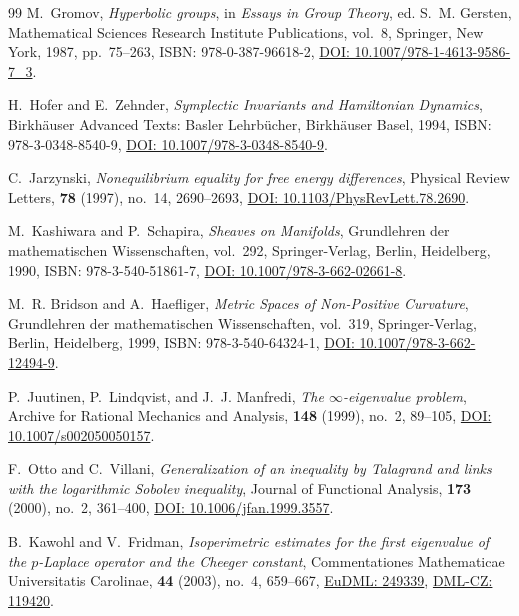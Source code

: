 \documentclass[11pt,a4paper,reqno]{amsart}
\theoremstyle{definition}
\theoremstyle{remark}
\numberwithin{equation}{section}
\begin{document}
\begin{thebibliography}{99}
M.~Gromov,
\emph{Hyperbolic groups},
in \emph{Essays in Group Theory}, ed. S.~M. Gersten, Mathematical Sciences Research Institute Publications, vol.~8, Springer, New York, 1987, pp.~75--263,
ISBN: 978-0-387-96618-2,
\href{https://doi.org/10.1007/978-1-4613-9586-7_3}{DOI: 10.1007/978-1-4613-9586-7\_3}.

H.~Hofer and E.~Zehnder,
\emph{Symplectic Invariants and Hamiltonian Dynamics},
Birkh\"auser Advanced Texts: Basler Lehrb\"ucher, Birkh\"auser Basel, 1994,
ISBN: 978-3-0348-8540-9,
\href{https://doi.org/10.1007/978-3-0348-8540-9}{DOI: 10.1007/978-3-0348-8540-9}.

C.~Jarzynski,
\emph{Nonequilibrium equality for free energy differences},
Physical Review Letters, \textbf{78} (1997), no.~14, 2690--2693,
\href{https://doi.org/10.1103/PhysRevLett.78.2690}{DOI: 10.1103/PhysRevLett.78.2690}.

M.~Kashiwara and P.~Schapira,
\emph{Sheaves on Manifolds},
Grundlehren der mathematischen Wissenschaften, vol.~292, Springer-Verlag, Berlin, Heidelberg, 1990,
ISBN: 978-3-540-51861-7,
\href{https://doi.org/10.1007/978-3-662-02661-8}{DOI: 10.1007/978-3-662-02661-8}.

M.~R. Bridson and A.~Haefliger,
\emph{Metric Spaces of Non-Positive Curvature},
Grundlehren der mathematischen Wissenschaften, vol.~319, Springer-Verlag, Berlin, Heidelberg, 1999,
ISBN: 978-3-540-64324-1,
\href{https://doi.org/10.1007/978-3-662-12494-9}{DOI: 10.1007/978-3-662-12494-9}.

P.~Juutinen, P.~Lindqvist, and J.~J. Manfredi,
\emph{The $\infty$-eigenvalue problem},
Archive for Rational Mechanics and Analysis, \textbf{148} (1999), no.~2, 89--105,
\href{https://doi.org/10.1007/s002050050157}{DOI: 10.1007/s002050050157}.

F.~Otto and C.~Villani,
\emph{Generalization of an inequality by Talagrand and links with the logarithmic Sobolev inequality},
Journal of Functional Analysis, \textbf{173} (2000), no.~2, 361--400,
\href{https://doi.org/10.1006/jfan.1999.3557}{DOI: 10.1006/jfan.1999.3557}.

B.~Kawohl and V.~Fridman,
\emph{Isoperimetric estimates for the first eigenvalue of the $p$-Laplace operator and the Cheeger constant},
Commentationes Mathematicae Universitatis Carolinae, \textbf{44} (2003), no.~4, 659--667,
\href{https://eudml.org/doc/249339}{EuDML: 249339}, \href{https://dml.cz/handle/10338.dmlcz/119420}{DML-CZ: 119420}.


\end{thebibliography}
\end{document}
